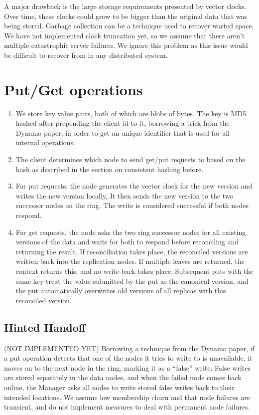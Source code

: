 \documentclass[paper=a4,fontsize=11pt]{report} %
\numberwithin{equation}{section} %
\numberwithin{figure}{section} %
\numberwithin{table}{section} %
\begin{document}
A major drawback is the large storage requirements presented by vector clocks. Over time, these clocks could grow to be bigger than the original data that was being stored. Garbage collection can be a technique used to recover wasted space. We have not implemented clock truncation yet, so we assume that there aren't multiple catastrophic server failures. We ignore this problem as this issue would be difficult to recover from in any distributed system.

\section{Put/Get operations}
\begin{enumerate}
\item We store key value pairs, both of which are blobs of bytes. The key is MD5 hashed after prepending the client id to it, borrowing a trick from the Dynamo paper, in order to get an unique identifier that is used for all internal operations.
\item The client determines which node to send get/put requests to based on the hash as described in the section on consistent hashing before.
\item For put requests, the node generates the vector clock for the new version and writes the new version locally, It then sends the new version to the two successor nodes on the ring. The write is considered successful if both nodes respond.
\item For get requests, the node asks the two ring successor nodes for all existing versions of the data and waits for both to respond before reconciling and returning the result. If reconciliation takes place, the reconciled versions are written back into the replication nodes. If multiple leaves are returned, the context returns this, and no write-back takes place. Subsequent puts with the same key treat the value submitted by the put as the canonical version, and the put automatically overwrites old versions of all replicas with this reconciled version.
\end{enumerate}

\subsection{Hinted Handoff} (NOT IMPLEMENTED YET)
Borrowing a technique from the Dynamo paper, if a put operation detects that one of the nodes it tries to write to is unavailable, it moves on to the next node in the ring, marking it as a ``false'' write. False writes are stored separately in the data nodes, and when the failed node comes back online, the Manager asks all nodes to write stored false writes back to their intended locations. We assume low membership churn and that node failures are transient, and do not implement measures to deal with permanent node failures.
\end{document}
